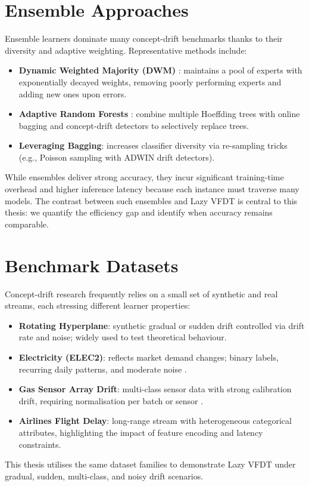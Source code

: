\section{Ensemble Approaches}
Ensemble learners dominate many concept-drift benchmarks thanks to their diversity and adaptive weighting.  Representative methods include:
\begin{itemize}
    \item \textbf{Dynamic Weighted Majority (DWM)} \cite{kolter2007dwm}: maintains a pool of experts with exponentially decayed weights, removing poorly performing experts and adding new ones upon errors.
    \item \textbf{Adaptive Random Forests} \cite{bifet2009arf}: combine multiple Hoeffding trees with online bagging and concept-drift detectors to selectively replace trees.
    \item \textbf{Leveraging Bagging}: increases classifier diversity via re-sampling tricks (e.g., Poisson sampling with ADWIN drift detectors).
\end{itemize}
While ensembles deliver strong accuracy, they incur significant training-time overhead and higher inference latency because each instance must traverse many models.  The contrast between such ensembles and Lazy VFDT is central to this thesis: we quantify the efficiency gap and identify when accuracy remains comparable.

\section{Benchmark Datasets}
Concept-drift research frequently relies on a small set of synthetic and real streams, each stressing different learner properties:
\begin{itemize}
    \item \textbf{Rotating Hyperplane}: synthetic gradual or sudden drift controlled via drift rate and noise; widely used to test theoretical behaviour.
    \item \textbf{Electricity (ELEC2)}: reflects market demand changes; binary labels, recurring daily patterns, and moderate noise \cite{harries1999electricity}.
    \item \textbf{Gas Sensor Array Drift}: multi-class sensor data with strong calibration drift, requiring normalisation per batch or sensor \cite{vergara2012gas}.
    \item \textbf{Airlines Flight Delay}: long-range stream with heterogeneous categorical attributes, highlighting the impact of feature encoding and latency constraints.
\end{itemize}
This thesis utilises the same dataset families to demonstrate Lazy VFDT under gradual, sudden, multi-class, and noisy drift scenarios.

